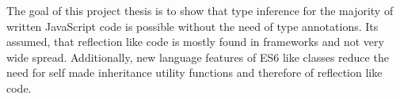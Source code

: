 The goal of this project thesis is to show that type inference for the majority of written JavaScript code is possible without the need of type annotations. Its assumed, that reflection like code is mostly found in frameworks and not very wide spread. Additionally, new language features of ES6 like classes reduce the need for self made inheritance utility functions and therefore of reflection like code.




